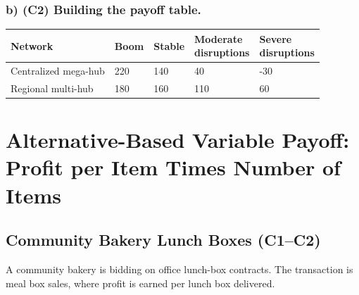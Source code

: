 	
	\subsubsection*{b) \textbf{(C2)} Building the payoff table.}
	\label{subsec:problem3-global-shipping-network-design-c2}
	\begin{center}
		\begin{tabular}{lllll}
			\toprule
			Network & Boom & Stable & \shortstack{Moderate\\disruptions} & \shortstack{Severe\\disruptions} \\
			\midrule
			Centralized mega-hub & 220 & 140 & 40 & -30 \\
			Regional multi-hub & 180 & 160 & 110 & 60 \\
			\bottomrule
		\end{tabular}
	\end{center}
	
	
	\section{Alternative-Based Variable Payoff: Profit per Item Times Number of Items}
	\label{sec:alternative-based-variable-payoff-profit-per-item-times-number-of-items}
	
	
	\subsection{Community Bakery Lunch Boxes (C1--C2)}
	\label{sec:problem4-community-bakery-lunch-boxes-c1-c2}
	A community bakery is bidding on office lunch-box contracts. The transaction is meal box sales, where profit is earned per lunch box delivered.
	
